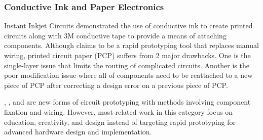 \subsubsection{Conductive Ink and Paper Electronics}
Instant Inkjet Circuits \cite{Instant_Inkjet_Circuits} demonstrated the use of conductive ink to create printed circuits along with 3M conductive tape to provide a means of attaching components.
Although \cite{Instant_Inkjet_Circuits} claims to be a rapid prototyping tool that replaces manual wiring, printed circuit paper (PCP) suffers from 2 major drawbacks. One is the single-layer issue that limits the routing of complicated circuits. Another is the poor modification issue where all of components need to be reattached to a new piece of PCP after correcting a design error on a previous piece of PCP.



\cite{Circuit_Stickers}, \cite{ShrinkyCircuits}, and \cite{Sketching_in_Circuits} are new forms of circuit prototyping with methods involving component fixation and wiring.
However, most related work in this category focus on education, creativity, and design instead of targeting rapid prototyping for advanced hardware design and implementation.

